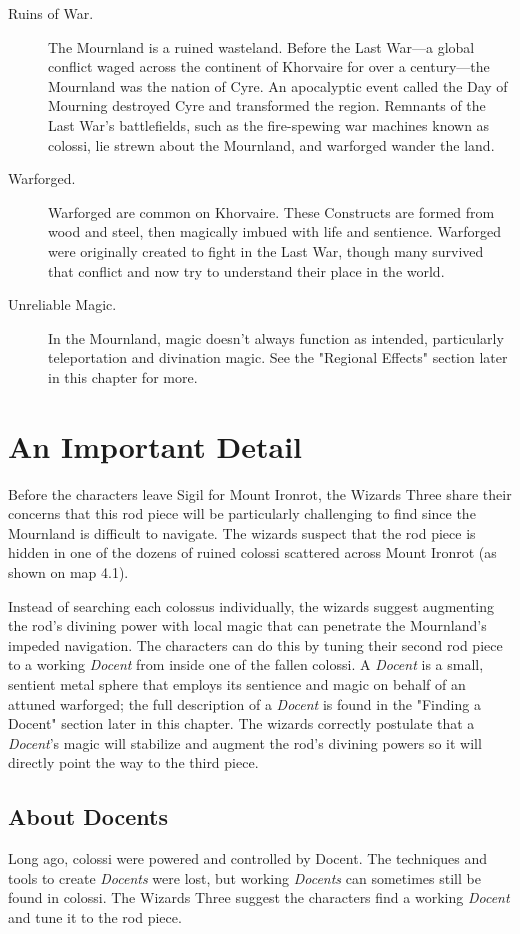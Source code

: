 \documentclass[10pt,a4paper,twoside,bg=print,twocolumn,openany,nodeprecatedcode]{dndbook}
\begin{document}
\begin{description}
\item[Ruins of War.]
The Mournland is a ruined wasteland. Before the Last War—a global conflict waged across the continent of Khorvaire for over a century—the Mournland was the nation of Cyre. An apocalyptic event called the Day of Mourning destroyed Cyre and transformed the region. Remnants of the Last War's battlefields, such as the fire-spewing war machines known as colossi, lie strewn about the Mournland, and warforged wander the land.
\item[Warforged.]
Warforged are common on Khorvaire. These Constructs are formed from wood and steel, then magically imbued with life and sentience. Warforged were originally created to fight in the Last War, though many survived that conflict and now try to understand their place in the world.
\item[Unreliable Magic.]
In the Mournland, magic doesn't always function as intended, particularly teleportation and divination magic. See the "Regional Effects" section later in this chapter for more.
\end{description}

\section{An Important Detail}
Before the characters leave Sigil for Mount Ironrot, the Wizards Three share their concerns that this rod piece will be particularly challenging to find since the Mournland is difficult to navigate. The wizards suspect that the rod piece is hidden in one of the dozens of ruined colossi scattered across Mount Ironrot (as shown on map 4.1).

Instead of searching each colossus individually, the wizards suggest augmenting the rod's divining power with local magic that can penetrate the Mournland's impeded navigation. The characters can do this by tuning their second rod piece to a working \textit{Docent} from inside one of the fallen colossi. A \textit{Docent} is a small, sentient metal sphere that employs its sentience and magic on behalf of an attuned warforged; the full description of a \textit{Docent} is found in the "Finding a Docent" section later in this chapter. The wizards correctly postulate that a \textit{Docent}'s magic will stabilize and augment the rod's divining powers so it will directly point the way to the third piece.

\subsection{About Docents}
Long ago, colossi were powered and controlled by Docent. The techniques and tools to create \textit{Docents} were lost, but working \textit{Docents} can sometimes still be found in colossi. The Wizards Three suggest the characters find a working \textit{Docent} and tune it to the rod piece.
\end{document}
